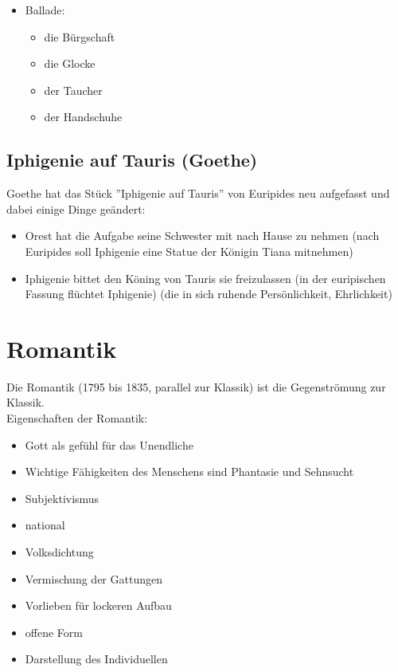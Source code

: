 \documentclass[12pt,a4paper]{article}
\begin{document}
\begin{itemize}
		\item Ballade:
			\begin{itemize}
			\item die Bürgschaft
			\item die Glocke
			\item der Taucher
			\item der Handschuhe
			\end{itemize}
	
\end{itemize}

\subsection{Iphigenie auf Tauris (Goethe)}

Goethe hat das Stück ''Iphigenie auf Tauris'' von Euripides neu aufgefasst und dabei einige Dinge geändert:

\begin{itemize}
\item Orest hat die Aufgabe seine Schwester mit nach Hause zu nehmen (nach Euripides soll Iphigenie eine Statue der Königin Tiana mitnehmen)
\item Iphigenie bittet den Köning von Tauris sie freizulassen (in der euripischen Fassung flüchtet Iphigenie) (die in sich ruhende Persönlichkeit, Ehrlichkeit)
\end{itemize}

\newpage

\section{Romantik}

Die Romantik (1795 bis 1835, parallel zur Klassik) ist die Gegenströmung zur Klassik.\\

Eigenschaften der Romantik:

\begin{itemize}
\item Gott als gefühl für das Unendliche
\item Wichtige Fähigkeiten des Menschens sind Phantasie und Sehnsucht
\item Subjektivismus
\item national
\item Volksdichtung
\item Vermischung der Gattungen
\item Vorlieben für lockeren Aufbau
\item offene Form
\item Darstellung des Individuellen
\end{itemize}
\end{document}
